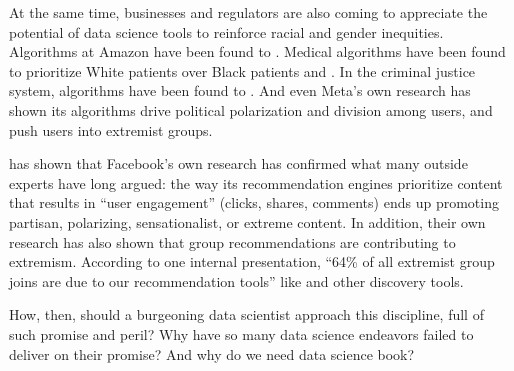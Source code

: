 \documentclass[letterpaper,10pt,english]{jupyterBook}
\begin{document}
\sphinxAtStartPar
At the same time, businesses and regulators are also coming to appreciate the potential of data science tools to reinforce racial and gender inequities. Algorithms at Amazon have been found to . Medical algorithms have been found to prioritize White patients over Black patients  and . In the criminal justice system, algorithms have been found to . And even Meta’s own research has shown its algorithms drive political polarization and division among users, and push users into extremist groups.%
\begin{footnote}[1]\sphinxAtStartFootnote
{} has shown that Facebook’s own research has confirmed what many outside experts have long argued: the way its recommendation engines prioritize content that results in “user engagement” (clicks, shares, comments) ends up promoting partisan, polarizing, sensationalist, or extreme content. In addition, their own research has also shown that group recommendations are contributing to extremism. According to one internal presentation, “64\% of all extremist group joins are due to our recommendation tools” like  and other discovery tools.
%
\end{footnote}

\sphinxAtStartPar
How, then, should a burgeoning data scientist approach this discipline, full of such promise and peril? Why have so many data science endeavors failed to deliver on their promise? And why do we need  data science book?
\end{document}
